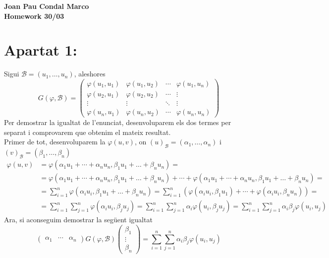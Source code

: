 \documentclass[a4paper, 12pt]{article}
\newcommand{\B}{\mathcal{B}}
\newcommand{\f}{\varphi}
\renewcommand{\u}{\alpha_1u_1+\cdots+\alpha_nu_n}
\renewcommand{\v}{\beta_1u_1+\dots+\beta_nu_n}
\begin{document}
    \begin{center}
        \Large
        \textbf{Joan Pau Condal Marco\\Homework 30/03\\}
        \normalsize
    \end{center}

    \section*{Apartat 1:}
    Sigui $\B = (u_1,\dots,u_n)$, aleshores
    \begin{equation}
        \label{eq:gram}
        G(\f, \B) = 
        \begin{pmatrix}
            \f(u_1,u_1) & \f(u_1,u_2) & \cdots & \f(u_1,u_n)\\
            \f(u_2,u_1) & \f(u_2,u_2) & \cdots & \vdots \\
            \vdots & \vdots & \ddots & \vdots \\
            \f(u_n, u_1) & \f(u_n,u_2) & \cdots & \f(u_n,u_n)
        \end{pmatrix}
    \end{equation}
    Per demostrar la igualtat de l'enunciat, desenvoluparem els dos termes per separat i comprovarem que obtenim el mateix resultat.\\
    Primer de tot, desenvoluparem la $\f(u,v)$, on $(u)_\B = (\alpha_1,\dots,\alpha_n)$ i $(v)_\B = (\beta_1,\dots,\beta_n)$
    \begin{align*}
        \f(u,v) &= \f(\u,\v)=\\
                &= \f(\u,\v) + \cdots + \f(\u,\v)=\\
                &= \sum_{i=1}^n\f(\alpha_iu_i,\v) = \sum_{i=1}^n\left( \f(\alpha_iu_i,\beta_1u_1)+\cdots+\f(\alpha_iu_i,\beta_nu_n) \right)=\\
                &= \sum_{i=1}^n \sum_{j=1}^n \f(\alpha_iu_i,\beta_ju_j) = \sum_{i=1}^n\sum_{j=1}^n \alpha_i\f(u_i,\beta_ju_j) = \sum_{i=1}^n\sum_{j=1}^n \alpha_i\beta_j\f(u_i,u_j)
    \end{align*}
    Ara, si aconseguim demostrar la seg\"uent igualtat
    \begin{equation}
        \label{eq:fi_u_v}
        \begin{pmatrix}
            \alpha_1 & \cdots & \alpha_n
        \end{pmatrix} 
        G(\f,\B) 
        \begin{pmatrix}
            \beta_1\\
            \vdots\\
            \beta_n
        \end{pmatrix}
        = \sum_{i=1}^n\sum_{j=1}^n \alpha_i\beta_j\f(u_i,u_j)
    \end{equation}
\end{document}

